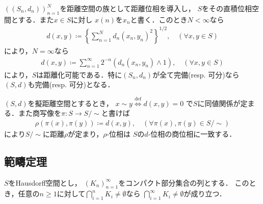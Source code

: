 	\begin{screen}
		\begin{thm}[距離空間の高々可算直積の距離]
			$((S_n,d_n))_{n=1}^N$を距離空間の族として距離位相を導入し，
			$S$をその直積位相空間とする．また$x \in S$に対し
			$x(n)$を$x_n$と書く．このとき$N < \infty$なら
			\begin{align}
				d(x,y)
				\coloneqq \left\{\sum_{n=1}^N d_n(x_n,y_n)^2\right\}^{1/2},
				\quad (\forall x,y \in S)
			\end{align}
			により，$N = \infty$なら
			\begin{align}
				d(x,y) \coloneqq
				\sum_{n=1}^\infty 2^{-n}\left(d_n(x_n,y_n) \wedge 1\right),
				\quad (\forall x,y \in S)
			\end{align}
			により，$S$は距離化可能である．特に$(S_n,d_n)$が全て完備(resp. 可分)なら
			$(S,d)$も完備(resp. 可分)となる．
		\end{thm}
	\end{screen}
	
	\begin{screen}
		\begin{thm}
		\end{thm}
	\end{screen}
	
	\begin{screen}
		\begin{thm}[擬距離の距離化]
			$(S,d)$を擬距離空間とするとき，
			$x \sim y \overset{\mathrm{def}}{\Longleftrightarrow} d(x,y) = 0$
			で$S$に同値関係が定まる．また商写像を$\pi:S \longrightarrow S/\sim$と書けば
			\begin{align}
				\rho(\pi(x),\pi(y)) \coloneqq d(x,y),
				\quad (\forall \pi(x),\pi(y) \in S/\sim)
			\end{align}
			により$S/\sim$に距離$\rho$が定まり，$\rho$-位相は
			$S$の$d$-位相の商位相に一致する．
		\end{thm}
	\end{screen}
	
\subsection{範疇定理}
	\begin{screen}
		\begin{thm}[Cantorの共通部分定理]\label{thm:Cantor_intersection_theorem}
			$S$をHausdorff空間とし，
			$(K_n)_{n=1}^\infty$をコンパクト部分集合の列とする．
			このとき，任意の$n \geq 1$に対して$\bigcap_{i=1}^n K_i \neq \emptyset$なら
			$\bigcap_{i=1}^\infty K_i \neq \emptyset$が成り立つ．
		\end{thm}
	\end{screen}
	

